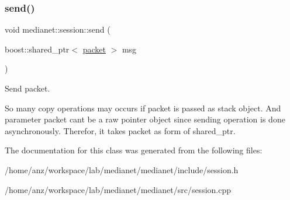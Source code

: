 \subsubsection{\texorpdfstring{send()}{send()}}
{\footnotesize\ttfamily void medianet\+::session\+::send (\begin{DoxyParamCaption}\item[{boost\+::shared\+\_\+ptr$<$ \mbox{\hyperlink{classmedianet_1_1packet}{packet}} $>$}]{msg }\end{DoxyParamCaption})}



Send packet. 

So many copy operations may occurs if packet is passed as stack object. And parameter packet can\textquotesingle{}t be a raw pointer object since sending operation is done asynchronously. Therefor, it takes packet as form of shared\+\_\+ptr. 

The documentation for this class was generated from the following files\+:\begin{DoxyCompactItemize}
\item 
/home/anz/workspace/lab/medianet/medianet/include/session.\+h\item 
/home/anz/workspace/lab/medianet/medianet/src/session.\+cpp\end{DoxyCompactItemize}
